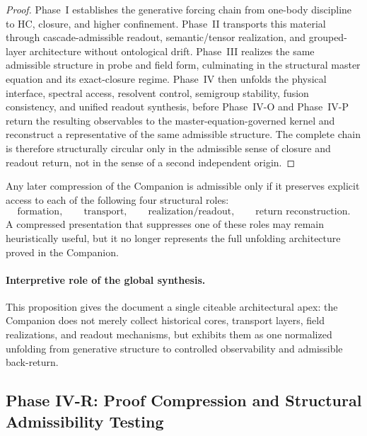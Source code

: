 \begin{proof}
Phase~I establishes the generative forcing chain from one-body discipline to HC, closure, and higher confinement. Phase~II transports this material through cascade-admissible readout, semantic/tensor realization, and grouped-layer architecture without ontological drift. Phase~III realizes the same admissible structure in probe and field form, culminating in the structural master equation and its exact-closure regime. Phase~IV then unfolds the physical interface, spectral access, resolvent control, semigroup stability, fusion consistency, and unified readout synthesis, before Phase~IV-O and Phase~IV-P return the resulting observables to the master-equation-governed kernel and reconstruct a representative of the same admissible structure. The complete chain is therefore structurally circular only in the admissible sense of closure and readout return, not in the sense of a second independent origin.\qedhere
\end{proof}

\begin{corollary}
Any later compression of the Companion is admissible only if it preserves explicit access to each of the following four structural roles:
\[
\text{formation},\qquad
\text{transport},\qquad
\text{realization/readout},\qquad
\text{return reconstruction}.
\]
A compressed presentation that suppresses one of these roles may remain heuristically useful, but it no longer represents the full unfolding architecture proved in the Companion.
\end{corollary}

\paragraph{Interpretive role of the global synthesis.}
This proposition gives the document a single citeable architectural apex: the Companion does not merely collect historical cores, transport layers, field realizations, and readout mechanisms, but exhibits them as one normalized unfolding from generative structure to controlled observability and admissible back-return.



\subsection*{Phase IV-R: Proof Compression and Structural Admissibility Testing}

